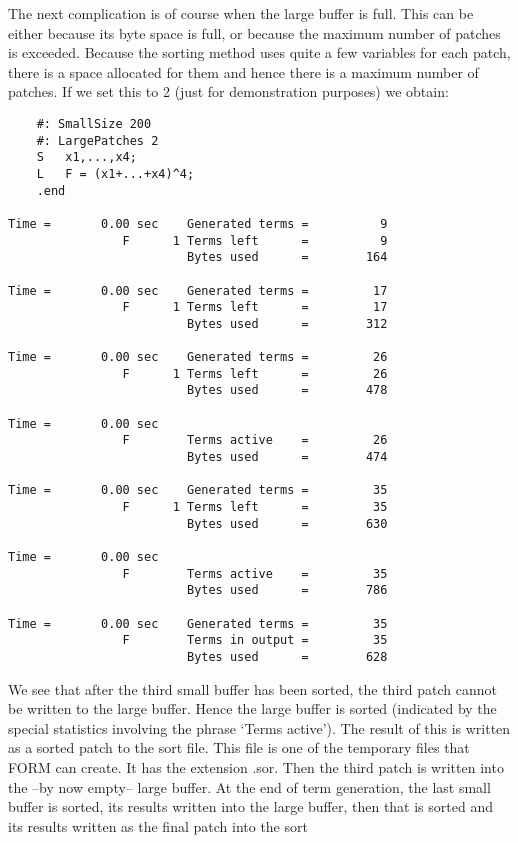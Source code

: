 The next complication is of course when the large buffer is full. This can 
be either because its byte space is full, or because the maximum number of 
patches is exceeded. Because the sorting method uses quite a few variables 
for each patch, there is a space allocated for them and hence there is a 
maximum number of patches. If we set this to 2 (just for demonstration 
purposes) we obtain:
\begin{verbatim}
    #: SmallSize 200
    #: LargePatches 2
    S	x1,...,x4;
    L	F = (x1+...+x4)^4;
    .end

Time =       0.00 sec    Generated terms =          9
                F      1 Terms left      =          9
                         Bytes used      =        164

Time =       0.00 sec    Generated terms =         17
                F      1 Terms left      =         17
                         Bytes used      =        312

Time =       0.00 sec    Generated terms =         26
                F      1 Terms left      =         26
                         Bytes used      =        478

Time =       0.00 sec
                F        Terms active    =         26
                         Bytes used      =        474

Time =       0.00 sec    Generated terms =         35
                F      1 Terms left      =         35
                         Bytes used      =        630

Time =       0.00 sec
                F        Terms active    =         35
                         Bytes used      =        786

Time =       0.00 sec    Generated terms =         35
                F        Terms in output =         35
                         Bytes used      =        628
\end{verbatim}
We see that after the third small buffer has been sorted, the third patch 
cannot be written to the large buffer. Hence the large buffer is sorted 
(indicated by the special statistics involving the phrase `Terms active'). 
The result of this is written as a sorted patch to the
sort file. This file is one of the 
temporary files that FORM can create. It has the 
extension .sor. Then the third patch is written into 
the --by now empty-- large buffer. At the end of term generation, the last 
small buffer is sorted, its results written into the large buffer, then 
that is sorted and its results written as the final patch into the sort 
